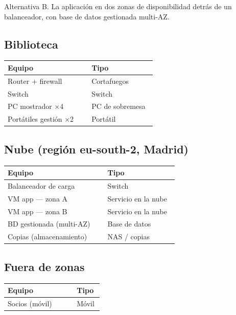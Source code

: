 \documentclass[11pt,a4paper]{article}
\begin{document}
Alternativa B. La aplicación en dos zonas de disponibilidad detrás de un balanceador, con base de datos gestionada multi-AZ.

\subsection*{Biblioteca}

{\small
\begin{longtable}{@{}>{\raggedright\arraybackslash}p{0.534\linewidth}>{\raggedright\arraybackslash}p{0.415\linewidth}@{}}
\toprule
\textbf{Equipo} & \textbf{Tipo} \\
\midrule
\endhead
Router + firewall & Cortafuegos \\
Switch & Switch \\
PC mostrador ×4 & PC de sobremesa \\
Portátiles gestión ×2 & Portátil \\
\bottomrule
\end{longtable}}

\subsection*{Nube (región eu-south-2, Madrid)}

{\small
\begin{longtable}{@{}>{\raggedright\arraybackslash}p{0.551\linewidth}>{\raggedright\arraybackslash}p{0.398\linewidth}@{}}
\toprule
\textbf{Equipo} & \textbf{Tipo} \\
\midrule
\endhead
Balanceador de carga & Switch \\
VM app — zona A & Servicio en la nube \\
VM app — zona B & Servicio en la nube \\
BD gestionada (multi-AZ) & Base de datos \\
Copias (almacenamiento) & NAS / copias \\
\bottomrule
\end{longtable}}

\subsection*{Fuera de zonas}

{\small
\begin{longtable}{@{}>{\raggedright\arraybackslash}p{0.686\linewidth}>{\raggedright\arraybackslash}p{0.263\linewidth}@{}}
\toprule
\textbf{Equipo} & \textbf{Tipo} \\
\midrule
\endhead
Socios (móvil) & Móvil \\
\bottomrule
\end{longtable}}
\end{document}
